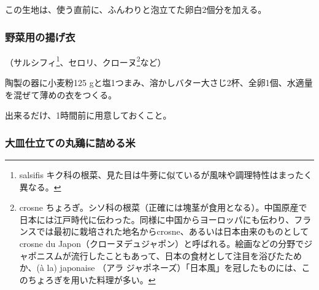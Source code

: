 \begin{recette}
この生地は、使う直前に、ふんわりと泡立てた卵白2個分を加える。

\atoaki{}

\hypertarget{pate-a-frire-pour-legumes}{%
\subsubsection{野菜用の揚げ衣}\label{pate-a-frire-pour-legumes}}



（サルシフィ\footnote{salsifis
  キク科の根菜、見た目は牛蒡に似ているが風味や調理特性はまったく異なる。}、セロリ、クローヌ\footnote{crosne
  ちょろぎ。シソ科の根菜（正確には塊茎が食用となる）。中国原産で日本には江戸時代に伝わった。同様に中国からヨーロッパにも伝わり、フランスでは最初に栽培された地名からcrosne、あるいは日本由来のものとしてcrosne
  du
  Japon（クローヌデュジャポン）と呼ばれる。絵画などの分野でジャポニスムが流行したこともあって、日本の食材として注目を浴びたためか、(à
  la) japonaise （アラ
  ジャポネーズ）「日本風」を冠したものには、このちょろぎを用いた料理が多い。}など）

陶製の器に小麦粉125
gと塩1つまみ、溶かしバター大さじ2杯、全卵1個、水適量を混ぜて薄めの衣をつくる。

出来るだけ、1時間前に用意しておくこと。

\atoaki{}

\hypertarget{riz-pour-farcir-les-volailles-servies-en-releve-ou-en-entree}{%
\subsubsection{大皿仕立ての丸鶏に詰める米}\label{riz-pour-farcir-les-volailles-servies-en-releve-ou-en-entree}}



\end{recette}
